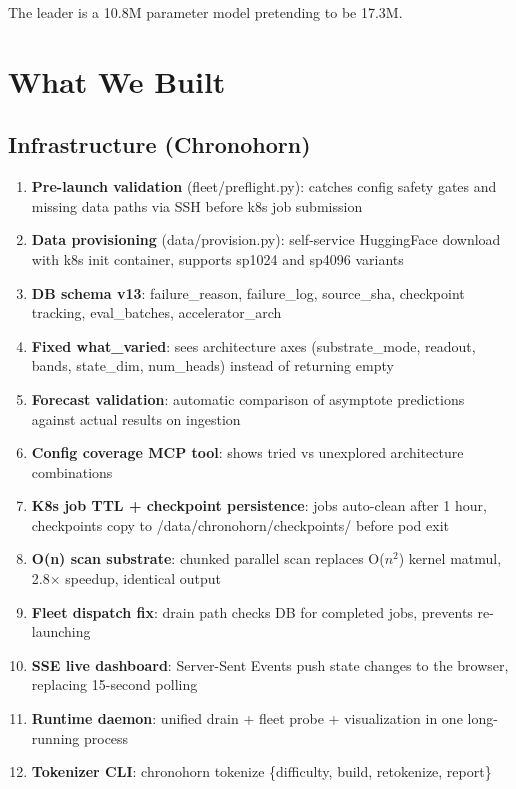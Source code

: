 \documentclass[11pt,a4paper]{report}
\begin{document}
The leader is a 10.8M parameter model pretending to be 17.3M.


\chapter{What We Built}

\section{Infrastructure (Chronohorn)}

\begin{enumerate}
\item \textbf{Pre-launch validation} (fleet/preflight.py): catches config safety gates and missing data paths via SSH before k8s job submission
\item \textbf{Data provisioning} (data/provision.py): self-service HuggingFace download with k8s init container, supports sp1024 and sp4096 variants
\item \textbf{DB schema v13}: failure\_reason, failure\_log, source\_sha, checkpoint tracking, eval\_batches, accelerator\_arch
\item \textbf{Fixed what\_varied}: sees architecture axes (substrate\_mode, readout, bands, state\_dim, num\_heads) instead of returning empty
\item \textbf{Forecast validation}: automatic comparison of asymptote predictions against actual results on ingestion
\item \textbf{Config coverage MCP tool}: shows tried vs unexplored architecture combinations
\item \textbf{K8s job TTL + checkpoint persistence}: jobs auto-clean after 1 hour, checkpoints copy to /data/chronohorn/checkpoints/ before pod exit
\item \textbf{O(n) scan substrate}: chunked parallel scan replaces O($n^2$) kernel matmul, 2.8$\times$ speedup, identical output
\item \textbf{Fleet dispatch fix}: drain path checks DB for completed jobs, prevents re-launching
\item \textbf{SSE live dashboard}: Server-Sent Events push state changes to the browser, replacing 15-second polling
\item \textbf{Runtime daemon}: unified drain + fleet probe + visualization in one long-running process
\item \textbf{Tokenizer CLI}: chronohorn tokenize \{difficulty, build, retokenize, report\}
\end{enumerate}
\end{document}
